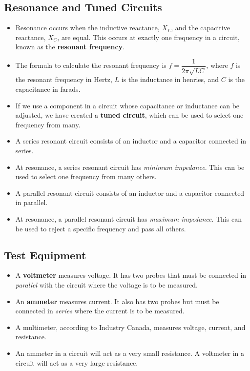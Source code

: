 \documentclass[letterpaper,12pt]{scrartcl}
\begin{document}
\subsection{Resonance and Tuned Circuits}

\begin{itemize}
\item Resonance occurs when the inductive reactance, $X_L$, and the capacitive reactance, $X_C$, are equal.
This occurs at exactly one frequency in a circuit, known as the \textbf{resonant frequency}.
\item The formula to calculate the resonant frequency is $f = \dfrac{1}{2 \pi \sqrt{LC}}$, where $f$ is the resonant 
frequency in Hertz, $L$ is the inductance in henries, and $C$ is the capacitance in farads.
\item If we use a component in a circuit whose capacitance or inductance can be adjusted,
we have created a \textbf{tuned circuit}, which can be used to select one frequency from many.
\item A series resonant circuit consists of an inductor and a capacitor connected in series.
\item At resonance, a series resonant circuit has \textit{minimum impedance}. This can be used to select
one frequency from many others.
\item A parallel resonant circuit consists of an inductor and a capacitor connected in parallel.
\item At resonance, a parallel resonant circuit has \textit{maximum impedance}. This can be used to reject a specific frequency
 and pass all others.
\end{itemize}

\subsection{Test Equipment}

\begin{itemize}
\item A \textbf{voltmeter} measures voltage. It has two probes that must be connected in \textit{parallel} with the circuit where the voltage is to be measured.
\item An \textbf{ammeter} measures current. It also has two probes but must be connected in \textit{series} where the current is to be measured.
\item A multimeter, according to Industry Canada, measures voltage, current, and resistance.
\item An ammeter in a circuit will act as a very small resistance. A voltmeter in a circuit will act as a very large resistance.
\end{itemize}
\end{document}

